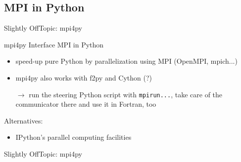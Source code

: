 \subsection{MPI in Python}

\begin{frame}{Slightly OffTopic: mpi4py}

\begin{exbox}{mpi4py}
    Interface MPI in Python
\end{exbox}

\begin{itemize}
    \item speed-up pure Python by parallelization using MPI (OpenMPI, mpich...)
    \item mpi4py also works with f2py and Cython (?)
    \item[$\rightarrow$] run the steering Python script with
    {\texttt{mpirun...}}, take care of the communicator there and use
    it in Fortran, too
\end{itemize}

Alternatives:

\begin{itemize}
    \item IPython's parallel computing facilities
\end{itemize}

\end{frame}

\begin{frame}[fragile]{Slightly OffTopic: mpi4py}



\end{frame}

